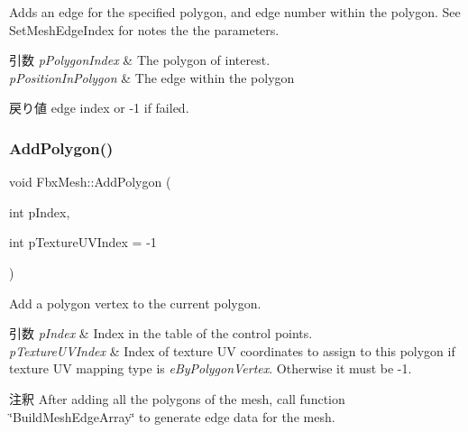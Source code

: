 Adds an edge for the specified polygon, and edge number within the polygon. See Set\+Mesh\+Edge\+Index for notes the the parameters. 
\begin{DoxyParams}{引数}
{\em p\+Polygon\+Index} & The polygon of interest. \\
\hline
{\em p\+Position\+In\+Polygon} & The edge within the polygon \\
\hline
\end{DoxyParams}
\begin{DoxyReturn}{戻り値}
edge index or -\/1 if failed. 
\end{DoxyReturn}
\mbox{\label{class_fbx_mesh_ab483f915e44a3a3613da51bcbe1a2ad6}} 
\subsubsection{\texorpdfstring{Add\+Polygon()}{AddPolygon()}}
{\footnotesize\ttfamily void Fbx\+Mesh\+::\+Add\+Polygon (\begin{DoxyParamCaption}\item[{int}]{p\+Index,  }\item[{int}]{p\+Texture\+U\+V\+Index = {\ttfamily -\/1} }\end{DoxyParamCaption})}

Add a polygon vertex to the current polygon. 
\begin{DoxyParams}{引数}
{\em p\+Index} & Index in the table of the control points. \\
\hline
{\em p\+Texture\+U\+V\+Index} & Index of texture UV coordinates to assign to this polygon if texture UV mapping type is {\itshape e\+By\+Polygon\+Vertex}. Otherwise it must be {\ttfamily -\/1}. \\
\hline
\end{DoxyParams}
\begin{DoxyRemark}{注釈}
After adding all the polygons of the mesh, call function \char`\"{}\+Build\+Mesh\+Edge\+Array\char`\"{} to generate edge data for the mesh. 
\end{DoxyRemark}
\mbox{\label{class_fbx_mesh_a306f0e4f4a05de664327bb4389d0bfbf}} 

